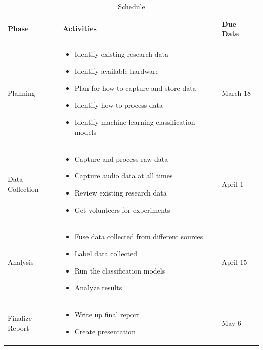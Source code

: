 \documentclass[conference]{IEEEtran}
\begin{document}
	\begin{table}[htbp]
		\caption{Schedule}
		\begin{center}
			\begin{tabular}{| m{1.2cm} | m{4cm} | m{1.2cm} |}
				\hline
				\textbf{Phase} & \textbf{Activities} & \textbf{Due Date} \\
				\hline
				Planning & 
				\begin{itemize}
					\item Identify existing research data
					\item Identify available hardware
					\item Plan for how to capture and store data
					\item Identify how to process data
					\item Identify machine learning classification models
				\end{itemize} &
				March 18 \\
				\hline
				
				Data Collection & 
				\begin{itemize}
					\item Capture and process raw data
					\item Capture audio data at all times
					\item Review existing research data
					\item Get volunteers for experiments
				\end{itemize} & 
				April 1 \\
				\hline
				
				Analysis & 
				\begin{itemize}
					\item Fuse data collected from different sources
					\item Label data collected
					\item Run the classification models
					\item Analyze results
				\end{itemize} & 
				April 15 \\
				\hline
				
				Finalize Report & 
				\begin{itemize}
					\item Write up final report
					\item Create presentation
				\end{itemize} & 
				May 6 \\
				\hline
			\end{tabular}
			\label{tab: Schedule}
		\end{center}
	\end{table}
	
\end{document}
